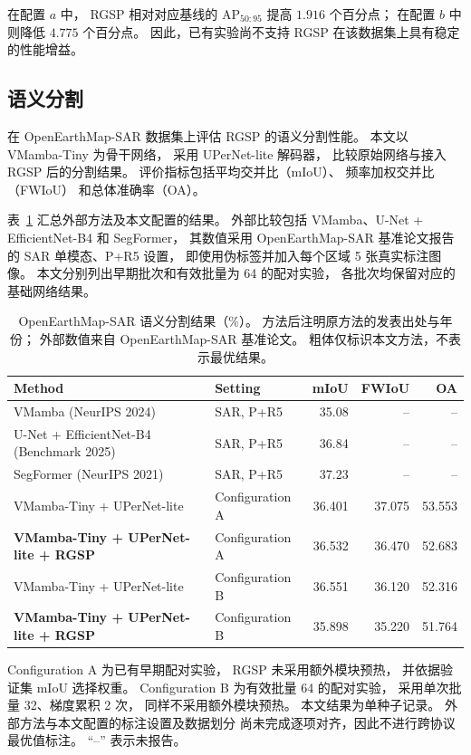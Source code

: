 \documentclass[journal]{IEEEtran}
\begin{document}
在配置 $a$ 中，
RGSP 相对对应基线的 AP$_{50:95}$
提高 $1.916$ 个百分点；
在配置 $b$ 中则降低 $4.775$ 个百分点。
因此，已有实验尚不支持
RGSP 在该数据集上具有稳定的性能增益。
\subsection{语义分割}
\label{sec:segmentation_results}

在 OpenEarthMap-SAR 数据集上评估 RGSP 的语义分割性能。
本文以 VMamba-Tiny 为骨干网络，
采用 UPerNet-lite 解码器，
比较原始网络与接入 RGSP 后的分割结果。
评价指标包括平均交并比（mIoU）、
频率加权交并比（FWIoU）
和总体准确率（OA）。

表~\ref{tab:openearthmap_sar_comparison}
汇总外部方法及本文配置的结果。
外部比较包括 VMamba、U-Net + EfficientNet-B4
和 SegFormer，
其数值采用 OpenEarthMap-SAR 基准论文报告的
SAR 单模态、P+R5 设置，
即使用伪标签并加入每个区域 5 张真实标注图像。
本文分别列出早期批次和有效批量为 64 的配对实验，
各批次均保留对应的基础网络结果。

\begin{table}[tp]
\centering
\small
\setlength{\tabcolsep}{4pt}
\caption{OpenEarthMap-SAR 语义分割结果（\%）。
方法后注明原方法的发表出处与年份；
外部数值来自 OpenEarthMap-SAR 基准论文。
粗体仅标识本文方法，不表示最优结果。}
\label{tab:openearthmap_sar_comparison}
\begin{tabular*}{\textwidth}{@{\extracolsep{\fill}}llrrr}
\toprule
Method & Setting & mIoU & FWIoU & OA \\
\midrule
VMamba (NeurIPS 2024)
& SAR, P+R5
& 35.08 & -- & -- \\

U-Net + EfficientNet-B4 (Benchmark 2025)
& SAR, P+R5
& 36.84 & -- & -- \\

SegFormer (NeurIPS 2021)
& SAR, P+R5
& 37.23 & -- & -- \\

\midrule
VMamba-Tiny + UPerNet-lite
& Configuration A
& 36.401 & 37.075 & 53.553 \\

\textbf{VMamba-Tiny + UPerNet-lite + RGSP}
& Configuration A
& 36.532 & 36.470 & 52.683 \\

VMamba-Tiny + UPerNet-lite
& Configuration B
& 36.551 & 36.120 & 52.316 \\

\textbf{VMamba-Tiny + UPerNet-lite + RGSP}
& Configuration B
& 35.898 & 35.220 & 51.764 \\
\bottomrule
\end{tabular*}

\smallskip
\begin{minipage}{\linewidth}
\footnotesize
Configuration A 为已有早期配对实验，
RGSP 未采用额外模块预热，
并依据验证集 mIoU 选择权重。
Configuration B 为有效批量 64 的配对实验，
采用单次批量 32、梯度累积 2 次，
同样不采用额外模块预热。
本文结果为单种子记录。
外部方法与本文配置的标注设置及数据划分
尚未完成逐项对齐，因此不进行跨协议最优值标注。
``--'' 表示未报告。
\end{minipage}
\end{table}
\end{document}
